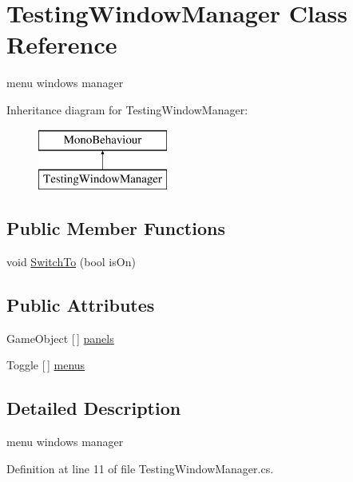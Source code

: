 \hypertarget{class_testing_window_manager}{}\section{Testing\+Window\+Manager Class Reference}
\label{class_testing_window_manager}


menu windows manager  


Inheritance diagram for Testing\+Window\+Manager\+:\begin{figure}[H]
\begin{center}
\leavevmode
\includegraphics[height=2.000000cm]{class_testing_window_manager}
\end{center}
\end{figure}
\subsection*{Public Member Functions}
\begin{DoxyCompactItemize}
\item 
void \mbox{\hyperlink{class_testing_window_manager_ac1405389a3ba1b9e8b2d47893ea546f0}{Switch\+To}} (bool is\+On)
\end{DoxyCompactItemize}
\subsection*{Public Attributes}
\begin{DoxyCompactItemize}
\item 
Game\+Object \mbox{[}$\,$\mbox{]} \mbox{\hyperlink{class_testing_window_manager_aebb909cfdead55f755680e0e409e1974}{panels}}
\item 
Toggle \mbox{[}$\,$\mbox{]} \mbox{\hyperlink{class_testing_window_manager_a168a9b08d5b0bae7dac1bc68fc5a4380}{menus}}
\end{DoxyCompactItemize}


\subsection{Detailed Description}
menu windows manager 



Definition at line 11 of file Testing\+Window\+Manager.\+cs.



